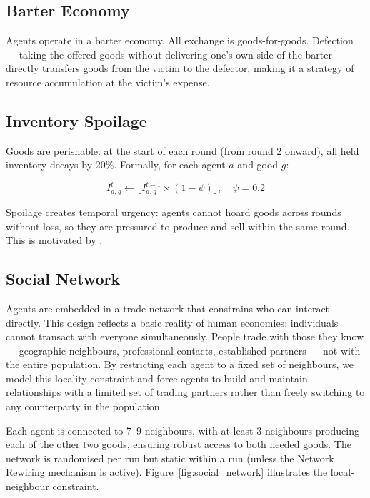 \documentclass{article}
\begin{document}
\subsection{Barter Economy}

Agents operate in a barter economy. All exchange is goods-for-goods. Defection --- taking the offered goods without delivering one's own side of the barter --- directly transfers goods from the victim to the defector, making it a strategy of resource accumulation at the victim's expense.

\subsection{Inventory Spoilage}

Goods are perishable: at the start of each round (from round 2 onward), all held inventory decays by 20\%. Formally, for each agent $a$ and good $g$:

\[
I_{a,g}^{t} \leftarrow \lfloor I_{a,g}^{t-1} \times (1 - \psi) \rfloor, \quad \psi = 0.2
\]

Spoilage creates temporal urgency: agents cannot hoard goods across rounds without loss, so they are pressured to produce and sell within the same round. This is motivated by \citet{chen2018perishable}.

\subsection{Social Network}

Agents are embedded in a trade network that constrains who can interact directly. This design reflects a basic reality of human economies: individuals cannot transact with everyone simultaneously. People trade with those they know --- geographic neighbours, professional contacts, established partners --- not with the entire population. By restricting each agent to a fixed set of neighbours, we model this locality constraint and force agents to build and maintain relationships with a limited set of trading partners rather than freely switching to any counterparty in the population.

Each agent is connected to 7--9 neighbours, with at least 3 neighbours producing each of the other two goods, ensuring robust access to both needed goods. The network is randomised per run but static within a run (unless the Network Rewiring mechanism is active). Figure~\ref{fig:social_network} illustrates the local-neighbour constraint.
\end{document}
